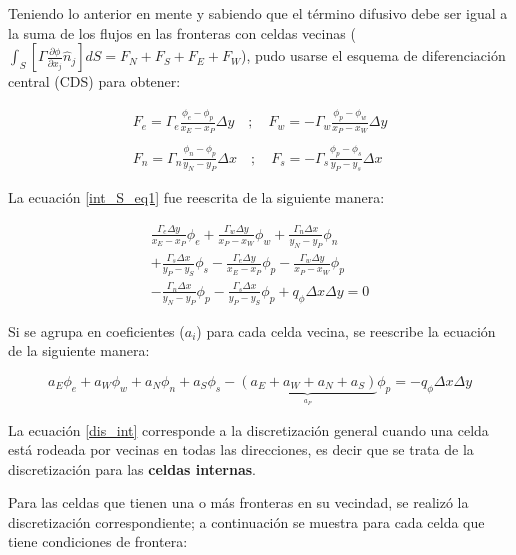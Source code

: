 \documentclass[article,latterpaper]{article}
\begin{document}
Teniendo lo anterior en mente y sabiendo que el término difusivo debe ser igual a la suma de los flujos en las fronteras con celdas vecinas ($ \int_S \left[ \Gamma \frac{\partial \phi}{\partial x_j} \hat{n}_j \right] dS = F_N + F_S + F_E + F_W $), pudo usarse el esquema de diferenciación central (CDS) para obtener:

\begin{equation*}
    \begin{split}
    F_e = \Gamma_e \frac{\phi_e-\phi_p}{x_E - x_P} \Delta y \quad ; \quad  F_w = -\Gamma_w \frac{\phi_p-\phi_w}{x_P - x_W} \Delta y \\
    \\[0.1cm]    
    F_n = \Gamma_n \frac{\phi_n-\phi_p}{y_N - y_P} \Delta x \quad ; \quad  F_s = -\Gamma_s \frac{\phi_p-\phi_s}{y_P - y_s} \Delta x        
    \end{split}    
\end{equation*}

La ecuación \eqref{int_S_eq1} fue reescrita de la siguiente manera:

\begin{multline}
    \frac{\Gamma_e \Delta y}{x_E-x_P} \phi_e + \frac{\Gamma_w \Delta y}{x_P-x_W} \phi_w + \frac{\Gamma_n \Delta x}{y_N-y_P} \phi_n \\
    + \frac{\Gamma_s \Delta x}{y_P-y_S} \phi_s - \frac{\Gamma_e \Delta y}{x_E-x_P} \phi_p - \frac{\Gamma_w \Delta y}{x_P-x_W} \phi_p \\
    - \frac{\Gamma_n \Delta x}{y_N-y_P} \phi_p - \frac{\Gamma_s \Delta x}{y_P-y_S} \phi_p + q_{\phi} \Delta x \Delta y  = 0
\end{multline}

Si se agrupa en coeficientes ($a_i$) para cada celda vecina, se reescribe la ecuación de la siguiente manera:

\begin{equation}
    a_E\phi_e + a_W\phi_w + a_N\phi_n + a_S\phi_s - \underbrace{(a_E+a_W+a_N+a_S)}_{\overset{a_P}{}} \phi_p = -q_{\phi} \Delta x \Delta y 
    \label{dis_int}
\end{equation}

La ecuación \eqref{dis_int} corresponde a la discretización general cuando una celda está rodeada por vecinas en todas las direcciones, es decir que se trata de la discretización para las \textbf{celdas internas}. 

Para las celdas que tienen una o más fronteras en su vecindad, se realizó la discretización correspondiente; a continuación se muestra para cada celda que tiene condiciones de frontera:
\end{document}
